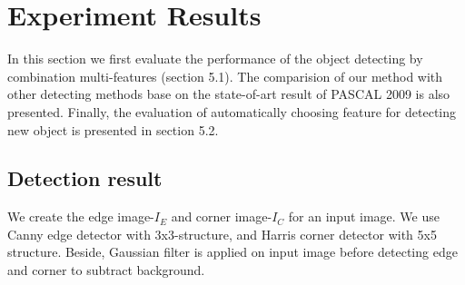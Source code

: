\section{Experiment Results}
\label{sec:results}
In this section we first evaluate the performance of the object
detecting by combination multi-features
(section 5.1). The comparision of our method with other detecting methods base on the state-of-art
result of PASCAL 2009 is also presented. Finally, the evaluation of automatically
choosing feature for detecting new object is presented in section 5.2.
\subsection{Detection result}
We create the edge image-$I_E$ and corner
image-$I_C$ for an input image. We use Canny edge detector with 3x3-structure, and Harris corner detector with 5x5 structure. Beside, Gaussian filter is applied on input image before detecting edge and corner to subtract background.

